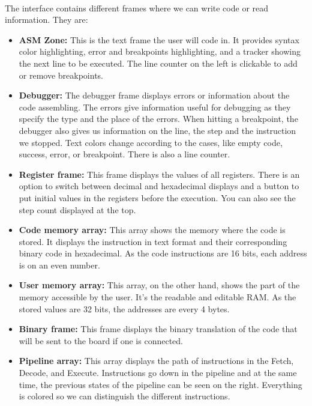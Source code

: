 \documentclass{article}
\begin{document}
\paragraph{}

The interface contains different frames where we can write code or read information. They are:

\begin{itemize}
  \item \textbf{ASM Zone:} This is the text frame the user will code in. It provides syntax color highlighting, error and breakpoints highlighting, and a tracker showing the next line to be executed. The line counter on the left is clickable to add or remove breakpoints.
  \item \textbf{Debugger:} The debugger frame displays errors or information about the code assembling. The errors give information useful for debugging as they specify the type and the place of the errors. When hitting a breakpoint, the debugger also gives us information on the line, the step and the instruction we stopped. Text colors change according to the cases, like empty code, success, error, or breakpoint. There is also a line counter.
  \item \textbf{Register frame:} This frame displays the values of all registers. There is an option to switch between decimal and hexadecimal displays and a button to put initial values in the registers before the execution. You can also see the step count displayed at the top.
  \item \textbf{Code memory array:} This array shows the memory where the code is stored. It displays the instruction in text format and their corresponding binary code in hexadecimal. As the code instructions are 16 bits, each address is on an even number.
  \item \textbf{User memory array:} This array, on the other hand, shows the part of the memory accessible by the user. It's the readable and editable RAM. As the stored values are 32 bits, the addresses are every 4 bytes.
  \item \textbf{Binary frame:} This frame displays the binary translation of the code that will be sent to the board if one is connected.
  \item \textbf{Pipeline array:} This array displays the path of instructions in the Fetch, Decode, and Execute. Instructions go down in the pipeline and at the same time, the previous states of the pipeline can be seen on the right. Everything is colored so we can distinguish the different instructions.
\end{itemize}
\end{document}
